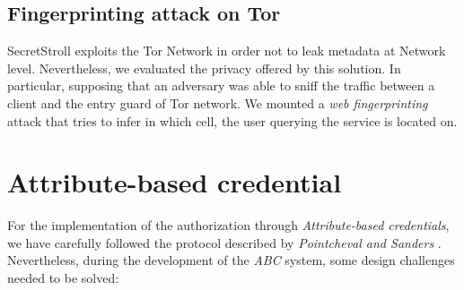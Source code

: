 \documentclass[10pt,conference,compsocconf]{IEEEtran}
\begin{document}
\subsection{Fingerprinting attack on Tor}
SecretStroll exploits the Tor Network in order not to leak metadata at Network level.
Nevertheless, we evaluated the privacy offered by this solution.
In particular, supposing that an adversary was able to sniff the traffic between a client and the entry guard of Tor network.
We mounted a \textit{web fingerprinting} attack that tries to infer in which cell, the user querying the service is located on.
\section{Attribute-based credential}
For the implementation of the authorization through \textit{Attribute-based
credentials}, we have carefully followed the protocol described by
\textit{Pointcheval and Sanders} \cite{PS_signature}. Nevertheless, during the
development of the \textit{ABC} system, some design challenges needed to be solved:
\end{document}
